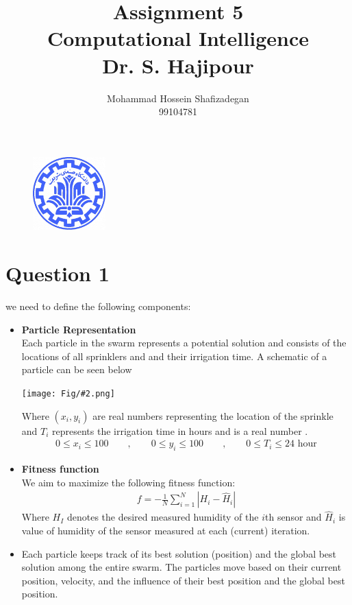 \documentclass[]{article}
\author{
	Mohammad Hossein Shafizadegan\\
	99104781
}
\title{
	Assignment 5 \\
	Computational Intelligence  \\
	Dr. S. Hajipour
}
\newcommand{\pict}[2]{\begin{center}
		\texttt{[image: Fig/\#2.png]}
\end{center}}
\begin{document}
	\begin{figure}
		\includegraphics[width=0.25\textwidth]{Fig/Sharif.png}
		\centering
	\end{figure}
	\maketitle
	\tableofcontents
	\newpage
	\section{Question 1}
	we need to define the following components:
	\begin{itemize}
		\item \textbf{Particle Representation} \\
		Each particle in the swarm represents a potential solution and consists of the locations of all sprinklers and and their irrigation time. A schematic of a particle can be seen below
		\pict{0.5}{F1}
		Where $(x_i, y_i)$ are real numbers representing the location of the sprinkle and $T_i$ represents the irrigation time in hours and is a real number .
		\begin{align*}
			0 \le x_i \le 100 \qquad , \qquad 0 \le y_i \le 100 \qquad , \qquad 0 \le T_i \le 24 \text{ hour}
		\end{align*}
	
		\item \textbf{Fitness function}\\
		We aim to maximize the following fitness function:
		\begin{align*}
			f = - \frac{1}{N} \sum_{i=1}^{N} \left|H_i - \hat{H}_i\right|
		\end{align*}
		Where $H_I$ denotes the desired measured humidity of the $i$th sensor and $\hat{H}_i$ is value of humidity of the sensor measured at each (current) iteration.
		
		\item Each particle keeps track of its best solution (position) and the global best solution among the entire swarm. The particles move based on their current position, velocity, and the influence of their best position and the global best position.
	\end{itemize}
	
\end{document}
